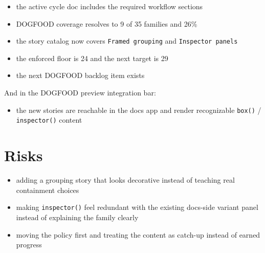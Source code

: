 \begin{itemize}
\tightlist
\item
  the active cycle doc includes the required workflow sections
\item
  DOGFOOD coverage resolves to 9 of 35 families and 26\%
\item
  the story catalog now covers \texttt{F\allowbreak{}r\allowbreak{}a\allowbreak{}m\allowbreak{}e\allowbreak{}d\allowbreak{} \allowbreak{}g\allowbreak{}r\allowbreak{}o\allowbreak{}u\allowbreak{}p\allowbreak{}i\allowbreak{}n\allowbreak{}g} and \texttt{I\allowbreak{}n\allowbreak{}s\allowbreak{}p\allowbreak{}e\allowbreak{}c\allowbreak{}t\allowbreak{}o\allowbreak{}r\allowbreak{} \allowbreak{}p\allowbreak{}a\allowbreak{}n\allowbreak{}e\allowbreak{}l\allowbreak{}s}
\item
  the enforced floor is 24 and the next target is 29
\item
  the next DOGFOOD backlog item exists
\end{itemize}

And in the DOGFOOD preview integration bar:

\begin{itemize}
\tightlist
\item
  the new stories are reachable in the docs app and render recognizable \texttt{b\allowbreak{}o\allowbreak{}x\allowbreak{}(\allowbreak{})} / \texttt{i\allowbreak{}n\allowbreak{}s\allowbreak{}p\allowbreak{}e\allowbreak{}c\allowbreak{}t\allowbreak{}o\allowbreak{}r\allowbreak{}(\allowbreak{})} content
\end{itemize}

\section{Risks}\label{record-068-risks}

\begin{itemize}
\tightlist
\item
  adding a grouping story that looks decorative instead of teaching real containment choices
\item
  making \texttt{i\allowbreak{}n\allowbreak{}s\allowbreak{}p\allowbreak{}e\allowbreak{}c\allowbreak{}t\allowbreak{}o\allowbreak{}r\allowbreak{}(\allowbreak{})} feel redundant with the existing docs-side variant panel instead of explaining the family clearly
\item
  moving the policy first and treating the content as catch-up instead of earned progress
\end{itemize}

